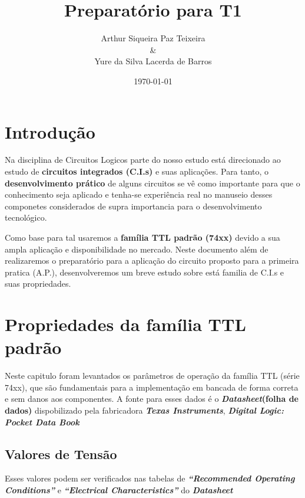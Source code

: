 \documentclass[11pt]{report}         %
\title{\textbf{Preparatório para T1}}
\author{Arthur Siqueira Paz Teixeira \\ \& \\ Yure da Silva Lacerda de Barros}
\affil{Disciplina: Circuitos Lógicos -- Professor: Fabio Marujo}
\date{\today}
\begin{document}

\maketitle                        %
\tableofcontents                  %

\chapter {Introdução}             %

Na disciplina de Circuitos Logicos parte do nosso estudo está direcionado ao estudo de \textbf{circuitos integrados (C.I.s)} e suas aplicações. Para tanto, o 
\textbf{desenvolvimento prático} de alguns circuitos se vê como importante para que o conhecimento seja aplicado e tenha-se experiência real no manuseio desses componetes 
considerados de supra importancia para o desenvolvimento tecnológico.

Como base para tal usaremos a \textbf{família TTL padrão (74xx)} devido a sua ampla aplicação e disponibilidade no mercado. Neste documento além de realizaremos 
o preparatório para a aplicação do circuito proposto para a primeira pratica (A.P.), desenvolveremos um breve estudo sobre está familia de C.I.s e suas propriedades.

\chapter {Propriedades da família TTL padrão}

Neste capitulo foram levantados os parâmetros de operação da família TTL (série 74xx), que são fundamentais para a implementação em bancada de forma correta e sem danos 
aos componentes. A fonte para esses dados é o \textbf{\textit{Datasheet}(folha de dados)} dispobilizado pela fabricadora \textbf{\textit{Texas Instruments}}, 
\textbf{\textit{Digital Logic: Pocket Data Book}}

\section{Valores de Tensão}

  Esses valores podem ser verificados nas tabelas de \textbf{\textit{``Recommended Operating Conditions''}} e \textbf{\textit{``Electrical Characteristics''}} do 
  \textbf{\textit{Datasheet}}
\end{document}

